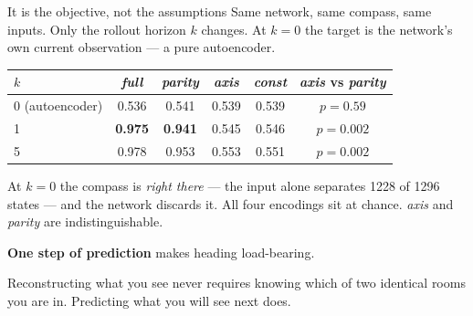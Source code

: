 \documentclass[9pt,aspectratio=169]{beamer}
\begin{document}
\begin{frame}{It is the objective, not the assumptions}
\vspace{4pt}
Same network, same compass, same inputs. Only the rollout horizon $k$ changes. At $k=0$ the target is
the network's own current observation --- a pure autoencoder.

\vspace{8pt}
\centering
\begin{tabular}{lccccc}
\toprule
$k$ & \textit{full} & \textit{parity} & \textit{axis} & \textit{const} & \textit{axis} vs \textit{parity} \\
\midrule
0 (autoencoder) & 0.536 & 0.541 & 0.539 & 0.539 & $p = 0.59$ \\
1               & \textbf{0.975} & \textbf{0.941} & 0.545 & 0.546 & $p = 0.002$ \\
5               & 0.978 & 0.953 & 0.553 & 0.551 & $p = 0.002$ \\
\bottomrule
\end{tabular}

\vspace{12pt}
\raggedright
At $k=0$ the compass is \emph{right there} --- the input alone separates 1228 of 1296 states --- and
the network \alert{discards it}. All four encodings sit at chance. \textit{axis} and \textit{parity}
are indistinguishable.

\vspace{6pt}
\textbf{One step of prediction} makes heading load-bearing.

\vspace{6pt}
Reconstructing what you see never requires knowing which of two identical rooms you are in.
Predicting what you will see next does.
\end{frame}
\end{document}
